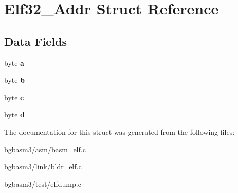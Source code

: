 \hypertarget{structElf32__Addr}{\section{Elf32\-\_\-\-Addr Struct Reference}
\label{structElf32__Addr}
}
\subsection*{Data Fields}
\begin{DoxyCompactItemize}
\item 
\hypertarget{structElf32__Addr_a18526b9a6a51669564096a1740e0133f}{byte {\bfseries a}}\label{structElf32__Addr_a18526b9a6a51669564096a1740e0133f}

\item 
\hypertarget{structElf32__Addr_aa93a1064e585aa423f7eba1cd865faa6}{byte {\bfseries b}}\label{structElf32__Addr_aa93a1064e585aa423f7eba1cd865faa6}

\item 
\hypertarget{structElf32__Addr_a1a676c7ad7c2c86702a0457f39bcf572}{byte {\bfseries c}}\label{structElf32__Addr_a1a676c7ad7c2c86702a0457f39bcf572}

\item 
\hypertarget{structElf32__Addr_ad5be153c85d0c2a754e9422d1c45c4cb}{byte {\bfseries d}}\label{structElf32__Addr_ad5be153c85d0c2a754e9422d1c45c4cb}

\end{DoxyCompactItemize}


The documentation for this struct was generated from the following files\-:\begin{DoxyCompactItemize}
\item 
bgbasm3/asm/basm\-\_\-elf.\-c\item 
bgbasm3/link/bldr\-\_\-elf.\-c\item 
bgbasm3/test/elfdump.\-c\end{DoxyCompactItemize}
